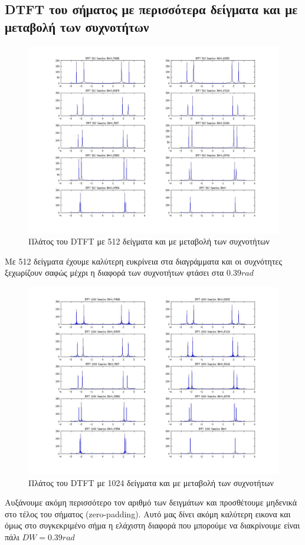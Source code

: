 \documentclass[a4paper,10pt]{article} \usepackage{anysize}
\begin{document}
\subsection{DTFT του σήματος με περισσότερα δείγματα και με μεταβολή των συχνοτήτων}
\begin{figure}[H]
\caption{Πλάτος του DTFT με 512 δείγματα και με μεταβολή των συχνοτήτων}
\centering
	\includegraphics[scale=0.4]{files/04-DTFT_512_Samples.jpg}
\end{figure}
Με 512 δείγματα έχουμε καλύτερη ευκρίνεια στα διαγράμματα και οι συχνότητες
ξεχωρίζουν σαφώς μέχρι η διαφορά των συχνοτήτων φτάσει στα $0.39 rad$
\begin{figure}[H]
\caption{Πλάτος του DTFT με 1024 δείγματα και με μεταβολή των συχνοτήτων}
\centering
	\includegraphics[scale=0.4]{files/05-DTFT_1024_Samples.jpg}
\end{figure}
Αυξάνουμε ακόμη περισσότερο τον αριθμό των δειγμάτων και προσθέτουμε μηδενικά
στο τέλος του σήματος (zero-padding). Αυτό μας δίνει ακόμη καλύτερη εικονα και
όμως στο συγκεκριμένο σήμα η ελάχιστη διαφορά που μπορούμε να διακρίνουμε
είναι πάλι $DW=0.39 rad$ 
\end{document}
